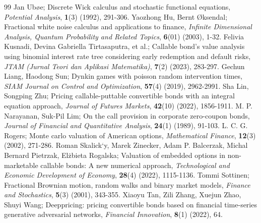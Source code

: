 \documentclass[10pt,a4paper]{amsart}
\numberwithin{equation}{section}
\begin{document}
\begin{thebibliography}{99}
 Jan Ub{\o}e;
Discrete Wick calculus and stochastic functional equations,
\emph{Potential Analysis}, \textbf{1}(3) (1992), 291-306.
 Yaozhong Hu, Bernt {\O}ksendal;
Fractional white noise calculus and applications to finance,
\emph{Infinite Dimensional Analysis, Quantum Probability and Related Topics}, \textbf{6}(01) (2003), 1-32.
 Felivia Kusnadi, Devina Gabriella Tirtasaputra, et al.;
Callable bond's value analysis using binomial interest rate tree considering early redemption and default risks,
\emph{JTAM (Jurnal Teori dan Aplikasi Matematika)}, \textbf{7}(2) (2023), 283-297.
 Gechun Liang, Haodong Sun;
Dynkin games with poisson random intervention times,
\emph{SIAM Journal on Control and Optimization}, \textbf{57}(4) (2019), 2962-2991.
 Sha Lin, Songping Zhu;
Pricing callable-puttable convertible bonds with an integral equation approach,
\emph{Journal of Futures Markets}, \textbf{42}(10) (2022), 1856-1911.
 M. P. Narayanan, Suk-Pil Lim;
On the call provision in corporate zero-coupon bonds,
\emph{Journal of Financial and Quantitative Analysis}, \textbf{24}(1) (1989), 91-103.
 L. C. G. Rogers;
Monte carlo valuation of American options,
\emph{Mathematical Finance}, \textbf{12}(3) (2002), 271-286.
 Roman Skalick`{y}, Marek Zinecker, Adam P. Balcerzak, 
Michal Bernard Pietrzak,  El\.{z}bieta Rogalska;
Valuation of embedded options in non-marketable callable bonds: A new numerical approach,
\emph{Technological and Economic Development of Economy}, \textbf{28}(4) (2022), 1115-1136.
 Tommi Sottinen;
Fractional Brownian motion, random walks and binary market models,
\emph{Finance and Stochastics}, \textbf{5}(3) (2001), 343-355.
 Xiaoyu Tan, Zili Zhang, Xuejun Zhao, Shuyi Wang;
Deeppricing: pricing convertible bonds based on financial time-series generative adversarial networks,
\emph{Financial Innovation}, \textbf{8}(1) (2022), 64.
\end{thebibliography}
\end{document}

